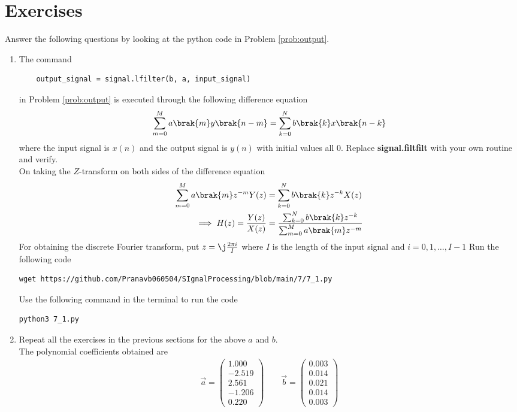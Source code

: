 \documentclass[journal,12pt,twocolumn]{IEEEtran}
\newcommand{\myvec}[1]{\ensuremath{\begin{pmatrix}#1\end{pmatrix}}}
\renewcommand\thesection{\arabic{section}}
\begin{document}
\section{Exercises}

Answer the following questions by looking at the python code in Problem \ref{prob:output}.
\begin{enumerate}[label=\thesection.\arabic*]
\item
The command
\begin{lstlisting}
	output_signal = signal.lfilter(b, a, input_signal)
	\end{lstlisting}
in Problem \ref{prob:output} is executed through the following difference equation
\begin{equation}
\label{eq:iir_filter_gen}
 \sum _{m=0}^{M}a\brak{m}y\brak{n-m}=\sum _{k=0}^{N}b\brak{k}x\brak{n-k}
\end{equation}
%
where the input signal is $x(n)$ and the output signal is $y(n)$ with initial values all 0. Replace
\textbf{signal.filtfilt} with your own routine and verify.\\
\solution
On taking the $Z$-transform on both sides of the difference equation
	\begin{align}
		\sum _{m=0}^{M}a\brak{m} z^{-m} Y(z) &= \sum _{k=0}^{N}b\brak{k} z^{-k} X(z) \\
		\implies H(z) = \frac{Y(z)}{X(z)} &= \frac{\sum _{k=0}^{N}b\brak{k} z^{-k}}{\sum _{m=0}^{M}a\brak{m} z^{-m	}}
	\end{align}
	For obtaining the discrete Fourier transform, put $z = \j \frac{2\pi i}{I}$ where $I$ is the length of the input signal and $i = 0, 1, \ldots, I-1$
Run the following code 
\begin{lstlisting}
wget https://github.com/Pranavb060504/SIgnalProcessing/blob/main/7/7_1.py
\end{lstlisting}
Use the following command in the terminal to run the code
\begin{lstlisting}
python3 7_1.py
\end{lstlisting}
%
\item Repeat all the exercises in the previous sections for the above $a$ and $b$.\\
\solution
The polynomial coefficients obtained are
	\begin{align}
		\vec{a} = \myvec{1.000 \\ -2.519 \\ 2.561 \\ -1.206 \\ 0.220} \qquad
		\vec{b} = \myvec{0.003 \\ 0.014 \\ 0.021 \\ 0.014 \\ 0.003}
	\end{align}
	

\end{enumerate}
\end{document}
